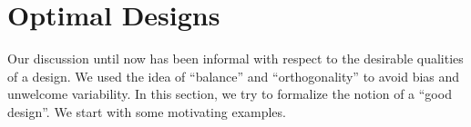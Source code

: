 %
%
%






\section{Optimal Designs}

Our discussion until now has been informal with respect to the desirable qualities of a design. 
We used the idea of ``balance'' and ``orthogonality'' to avoid bias and unwelcome variability.
In this section, we try to formalize the notion of a ``good design''.
We start with some motivating examples.


